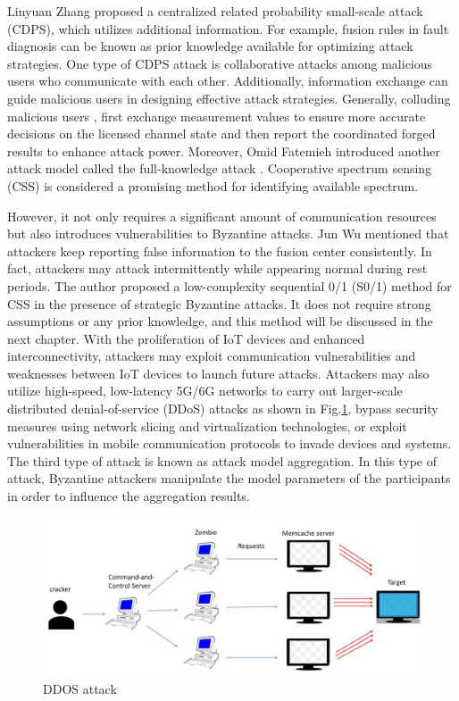 \documentclass[conference]{IEEEtran}
\begin{document}
Linyuan Zhang \cite{b114} proposed a centralized related probability small-scale attack (CDPS), which utilizes additional information.
For example, fusion rules in fault diagnosis \cite{b115} can be known as prior knowledge available for optimizing attack strategies.
One type of CDPS attack is collaborative attacks among malicious users who communicate with each other.
Additionally, information exchange can guide malicious users in designing effective attack strategies.
Generally, colluding malicious users \cite{b116},\cite{b117} first exchange measurement values to ensure more accurate
decisions on the licensed channel state and then report the coordinated forged results to enhance attack power.
Moreover, Omid Fatemieh introduced another attack model called the full-knowledge attack \cite{b118}.
Cooperative spectrum sensing (CSS) is considered a promising method for identifying available spectrum.

However, it not only requires a significant amount of communication resources but also introduces vulnerabilities to Byzantine attacks.
Jun Wu \cite{b119} mentioned that attackers keep reporting false information to the fusion center consistently.
In fact, attackers may attack intermittently while appearing normal during rest periods.
The author proposed a low-complexity sequential 0/1 (S0/1) method for CSS in the presence of strategic Byzantine attacks.
It does not require strong assumptions or any prior knowledge, and this method will be discussed in the next chapter.
With the proliferation of IoT devices and enhanced interconnectivity, attackers may exploit communication vulnerabilities and weaknesses 
between IoT devices to launch future attacks. Attackers may also utilize high-speed, low-latency 5G/6G networks to carry out 
larger-scale distributed denial-of-service (DDoS) attacks as shown in Fig.\ref{fig13}, bypass security measures using network slicing and virtualization technologies, or exploit vulnerabilities in mobile communication protocols to invade devices and systems.
The third type of attack is known as attack model aggregation.
In this type of attack, Byzantine attackers manipulate the model parameters of the participants in order
to influence the aggregation results.

\begin{figure}[htbp]
    \centerline{\includegraphics[width=0.8\linewidth,height=0.6\linewidth]{picture/ddos.jpg}}
    \caption{DDOS attack}
    \label{fig13}
\end{figure}
\end{document}
